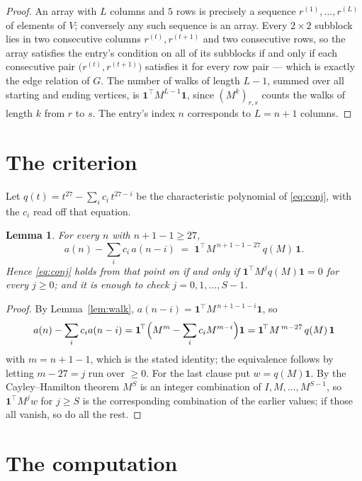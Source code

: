 \documentclass[11pt,a4paper]{article}
\theoremstyle{plain}
\newtheorem{lemma}[theorem]{Lemma}
\theoremstyle{definition}
\begin{document}
\begin{proof}
An array with $L$ columns and $5$ rows is precisely a sequence
$r^{(1)},\dots,r^{(L)}$ of elements of $V$; conversely any such sequence is an array.
Every $2\times2$ subblock lies in two consecutive columns $r^{(t)},r^{(t+1)}$ and two
consecutive rows, so the array satisfies the entry's condition on all of its subblocks
if and only if each consecutive pair $\bigl(r^{(t)},r^{(t+1)}\bigr)$ satisfies it for
every row pair --- which is exactly the edge relation of $G$. The number of walks of
length $L-1$, summed over all starting and ending vertices, is
$\mathbf{1}^{\!\top}M^{L-1}\mathbf{1}$, since $(M^{k})_{r,s}$ counts the walks of
length $k$ from $r$ to $s$. The entry's index $n$ corresponds to $L=n+1$ columns.
\end{proof}

\section{The criterion}

Let $q(t)=t^{27}-\sum_i c_i\,t^{27-i}$ be the characteristic polynomial of
\eqref{eq:conj}, with the $c_i$ read off that equation.

\begin{lemma}\label{lem:crit}
For every $n$ with $n+1-1\ge27$,
\[
a(n)-\sum_i c_i\,a(n-i)\;=\;\mathbf{1}^{\!\top}M^{\,n+1-1-27}\,q(M)\,\mathbf{1} .
\]
Hence \eqref{eq:conj} holds from that point on if and only if
$\mathbf{1}^{\!\top}M^{j}q(M)\mathbf{1}=0$ for every $j\ge0$; and it is enough to check
$j=0,1,\dots,S-1$.
\end{lemma}

\begin{proof}
By Lemma~\ref{lem:walk}, $a(n-i)=\mathbf{1}^{\!\top}M^{\,n+1-1-i}\mathbf{1}$, so
\[
a(n)-\sum_i c_i a(n-i)
=\mathbf{1}^{\!\top}\Bigl(M^{m}-\sum_i c_i M^{m-i}\Bigr)\mathbf{1}
=\mathbf{1}^{\!\top}M^{\,m-27}\,q(M)\,\mathbf{1}
\]
with $m=n+1-1$, which is the stated identity; the equivalence follows by letting
$m-27=j$ run over $\ge0$. For the last clause put $w=q(M)\mathbf{1}$. By the
Cayley--Hamilton theorem $M^{S}$ is an integer combination of $I,M,\dots,M^{S-1}$, so
$\mathbf{1}^{\!\top}M^{j}w$ for $j\ge S$ is the corresponding combination of the earlier
values; if those all vanish, so do all the rest.
\end{proof}

\section{The computation}
\end{document}
